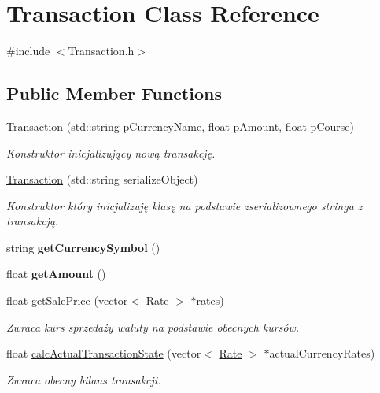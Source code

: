 \hypertarget{classTransaction}{}\section{Transaction Class Reference}
\label{classTransaction}


{\ttfamily \#include $<$Transaction.\+h$>$}

\subsection*{Public Member Functions}
\begin{DoxyCompactItemize}
\item 
\hyperlink{classTransaction_ac258a97f4d935e11d49b21f9f3d6defe}{Transaction} (std\+::string p\+Currency\+Name, float p\+Amount, float p\+Course)
\begin{DoxyCompactList}\small\item\em Konstruktor inicjalizujący nową transakcję. \end{DoxyCompactList}\item 
\hyperlink{classTransaction_a8083f77bdc361afadd7c6326453d652f}{Transaction} (std\+::string serialize\+Object)
\begin{DoxyCompactList}\small\item\em Konstruktor który inicjalizuję klasę na podstawie zserializownego stringa z transakcją. \end{DoxyCompactList}\item 
string {\bfseries get\+Currency\+Symbol} ()\hypertarget{classTransaction_abe47140de5b1def7196e3f76a6490d4b}{}\label{classTransaction_abe47140de5b1def7196e3f76a6490d4b}

\item 
float {\bfseries get\+Amount} ()\hypertarget{classTransaction_aabf5ff6f4bfa30951d07139216dcccf2}{}\label{classTransaction_aabf5ff6f4bfa30951d07139216dcccf2}

\item 
float \hyperlink{classTransaction_a059762af615ed813c24025ca012684cd}{get\+Sale\+Price} (vector$<$ \hyperlink{structRate}{Rate} $>$ $\ast$rates)
\begin{DoxyCompactList}\small\item\em Zwraca kurs sprzedaży waluty na podstawie obecnych kursów. \end{DoxyCompactList}\item 
float \hyperlink{classTransaction_adcc0338a76c1889e2878eec8d282089f}{calc\+Actual\+Transaction\+State} (vector$<$ \hyperlink{structRate}{Rate} $>$ $\ast$actual\+Currency\+Rates)
\begin{DoxyCompactList}\small\item\em Zwraca obecny bilans transakcji. \end{DoxyCompactList}\end{DoxyCompactItemize}


